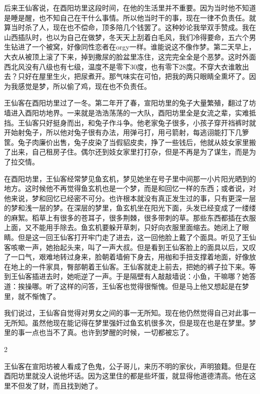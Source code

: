 后来王仙客说，在酉阳坊里这段时间，在他的生活里并不重要。因为当时他不知道是睡是醒，也不知自己在干什么事情。所以他当时干的事，现在一律不负责任。就算当时杀了人，现在也不偿命，顶多陪几个钱罢了。这种妙论我举双手赞成。我在山西插队时，也以为自己在做梦，冬天天上刮着白毛风，我们冷得要命，五六个男生钻进了一个被窝，好像同性恋者在orgy一样。谁能说这不像作梦。第二天早上，大衣从被顶上滚了下来，掉到撒尿的脸盆里冻住，这完完全全是个恶梦。这时外面西北风没有八级也有七级，温度不是零下30度，也有零下28度。不穿大衣谁敢出去？只好在屋里生火，把尿煮开。那气味实在可怕，把我的两只眼睛全熏坏了。因为我感觉是梦，所以偷了鸡，现在也不负责任。 

王仙客在酉阳坊里过了一冬。第二年开了春，宣阳坊里的兔子大量繁殖，翻过了坊墙进入酉阳坊地界。一来就是浩浩荡荡的一大队，酉阳坊里全是女流之辈，实难抵挡。王仙客只好挺身而出，和兔子作斗争。他老家兔子很多，小孩子穿开裆裤时就开始射兔子，所以他对兔子很有办法，用弹弓打，用弓箭射，每逃诩能打下几箩筐。兔子肉廉价出售，兔子皮染了当假貂皮卖，挣了一些钱后，他就从妓女家里搬了出来，自己租房子住。偶尔还到妓女家里打打杂，但是不再是为了谋生，而是为了拉交情。 

在酉阳坊里，王仙客经常梦见鱼玄机，梦见她坐在号子里中间那一小片阳光晒到的地方。这时候他不再觉得鱼玄机也是一个梦，而是和回忆一样的东西；或者说，对他来说，梦和回忆已经密不可分。也许根本就没有真正发生过的事，只有更深一层的梦和浅一层的梦。在深层的梦里，鱼玄机坐在阳光下面，头发已经变成了一缕缕的麻絮。稻草上有很多的苍耳子，很多荆棘，很多带刺的草。那些东西都插在衣服上面，又不能用手除去。鱼玄机要躲开草刺，只好向衣服里面缩去。她闭上了眼睛。但是这一回王仙客打开牢门走了进去，这一回他脸上戴了个面具。听见了王仙客咳嗽一声，她抬起头来，叫了一声大叔。但是看到王仙客脸上的面具以后，又叹了一口气，艰难地转过身来，脸朝着墙俯下身去，用枷和手扭支撑着地面，好像放在地上的一件家具，臀部朝着王仙客。王仙客就走上前去，把她的裤子拉下来。等到王仙客插进去时，她呃逆了一声。于是隔壁有人敲敲墙说：小鱼，干嘛哪？她答道：挨操哪。听了这样的问答，王仙客也觉得很惭愧。但是马上他又想起是在梦里，就不惭愧了。 

我们说过，王仙客自觉得对男女之间的事一无所知。现在他仍然觉得自己对此事一无所知。虽然他现在能记得在梦里强奸过鱼玄机很多次，但是现在也是在梦里。梦里的事一点也当不了真。也许到梦醒的时候，一切都被忘了。 

2 

王仙客在宣阳坊被人看成了色鬼，公子哥儿，来历不明的家伙，声明狼籍。但是在酉阳坊里就没人说他坏话。因为这里住的都是些坏蛋，就显得他道德清高。他在这里不但发了财，而且找到她了。 

